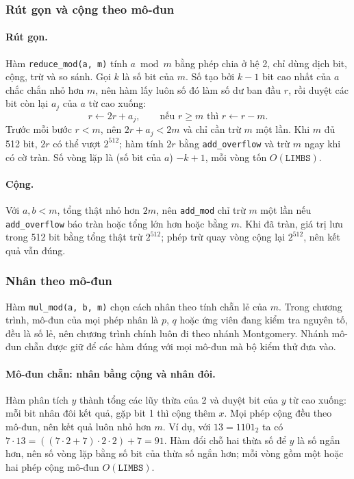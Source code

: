 \subsubsection{Rút gọn và cộng theo mô-đun}
\label{subsec:rut-gon-cong-mod}

\paragraph{Rút gọn.} Hàm \texttt{reduce\_mod(a, m)} tính $a \bmod m$ bằng phép chia ở hệ 2, chỉ dùng dịch bit, cộng, trừ và so sánh. Gọi $k$ là số bit của $m$. Số tạo bởi $k - 1$ bit cao nhất của $a$ chắc chắn nhỏ hơn $m$, nên hàm lấy luôn số đó làm số dư ban đầu $r$, rồi duyệt các bit còn lại $a_j$ của $a$ từ cao xuống:
\begin{equation}
r \leftarrow 2r + a_j, \qquad \text{nếu } r \ge m \text{ thì } r \leftarrow r - m .
\end{equation}
Trước mỗi bước $r < m$, nên $2r + a_j < 2m$ và chỉ cần trừ $m$ một lần. Khi $m$ đủ 512 bit, $2r$ có thể vượt $2^{512}$; hàm tính $2r$ bằng \texttt{add\_overflow} và trừ $m$ ngay khi có cờ tràn. Số vòng lặp là (số bit của $a$) $- k + 1$, mỗi vòng tốn $O(\texttt{LIMBS})$.

\paragraph{Cộng.} Với $a, b < m$, tổng thật nhỏ hơn $2m$, nên \texttt{add\_mod} chỉ trừ $m$ một lần nếu \texttt{add\_overflow} báo tràn hoặc tổng lớn hơn hoặc bằng $m$. Khi đã tràn, giá trị lưu trong 512 bit bằng tổng thật trừ $2^{512}$; phép trừ quay vòng cộng lại $2^{512}$, nên kết quả vẫn đúng.

\subsubsection{Nhân theo mô-đun}
\label{subsec:nhan-mod}

Hàm \texttt{mul\_mod(a, b, m)} chọn cách nhân theo tính chẵn lẻ của $m$. Trong chương trình, mô-đun của mọi phép nhân là $p$, $q$ hoặc ứng viên đang kiểm tra nguyên tố, đều là số lẻ, nên chương trình chính luôn đi theo nhánh Montgomery. Nhánh mô-đun chẵn được giữ để các hàm đúng với mọi mô-đun mà bộ kiểm thử đưa vào.

\paragraph{Mô-đun chẵn: nhân bằng cộng và nhân đôi.} Hàm phân tích $y$ thành tổng các lũy thừa của 2 và duyệt bit của $y$ từ cao xuống: mỗi bit nhân đôi kết quả, gặp bit 1 thì cộng thêm $x$. Mọi phép cộng đều theo mô-đun, nên kết quả luôn nhỏ hơn $m$. Ví dụ, với $13 = 1101_2$ ta có $7 \cdot 13 = ((7 \cdot 2 + 7) \cdot 2 \cdot 2) + 7 = 91$. Hàm đổi chỗ hai thừa số để $y$ là số ngắn hơn, nên số vòng lặp bằng số bit của thừa số ngắn hơn; mỗi vòng gồm một hoặc hai phép cộng mô-đun $O(\texttt{LIMBS})$.

